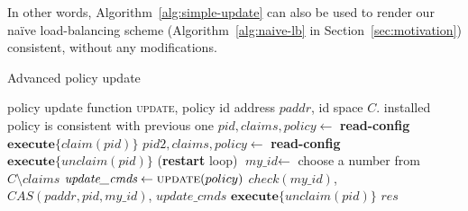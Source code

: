 \documentclass[conference]{sigcomm-alternate}
\newcommand{\hide}[1]{}
\newcommand{\claimcheck}{check\xspace}
\newcommand{\paddr}{\textit{paddr}\xspace}
\newcommand{\pid}{\textit{pid}\xspace}
\newcommand{\ufunc}{update} %
\newcommand{\ack}{\textit{ack}}
\begin{document}
In other words, Algorithm~\ref{alg:simple-update} can also be used
to render our na\"ive load-balancing scheme (Algorithm~\ref{alg:naive-lb} in Section~\ref{sec:motivation})
consistent, without any modifications.


\hide{
We compute our new suggested policy by applying the update requests on
top of current policy, supporting any kind of requests and
policies. Then we make a transaction (using the bundle feature) to
atomically check that our policy id is not blocked by another controller, to change the current policy id to ours (an action that would fail if the current policy id is no longer what we are counting of) and to actually configure our new policy.

If one of the actions in the transaction fails we try again. There is no progress guaranty for each controller but there is one for the whole system - at least one of the controller will succeed in fulfilling its update requirements.
}

{\small
\begin{algorithm}[t]
    \caption{Advanced policy update}
    \label{alg:update}
    \begin{algorithmic}[1]
        \Require policy update function \textsc{\ufunc}, policy id address $\paddr$, id space $C$.
    \Ensure installed policy is consistent with previous one
 		\Repeat
		 	\State $\pid,claims,policy\gets$ \textbf{read-config} %
 			\State $\textbf{execute}\{claim(\pid)\}$
 			\State $\pid 2,\textit{claims},\textit{policy}\gets$ \textbf{read-config} %
 			\If {$\pid\neq \pid 2$}
	 			\State $\textbf{execute} \{\textit{unclaim}(\pid)\}$
 				 (\textbf{restart} loop)
 			\EndIf
 			\State $\textit{my\_id}\gets$ choose a number from $C\setminus claims$
 			\State $\textit{update\_cmds}\gets \textsc{\ufunc}(policy)$
 			\startTxn
 				\State $\claimcheck(my\_id)$,
	 			\State $CAS(\paddr, \pid,my\_id)$,
	 			\State $\textit{update\_cmds}$ %
 			\endTxn
	 		\State $\textbf{execute} \{\textit{unclaim}(\pid)\}$
     	\Until{$res=\ack$}
			\Return $\textit{res}$

    \end{algorithmic}
\end{algorithm}
}


%
%
%
\end{document}
